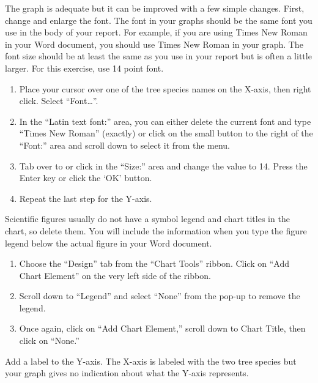 \documentclass[12pt, hidelinks]{exam}
\begin{document}
The graph is adequate but it can be improved with a few simple changes. First, change and enlarge the font. The font in your graphs should be the same font you use in the body of your report. For example, if you are using Times New Roman in your Word document, you should use Times New Roman in your graph. The font size should be at least the same as you use in your report but is often a little larger. For this exercise, use 14 point font.

\begin{enumerate}[resume]
	\item Place your cursor over one of the tree species names on the X-axis, then right click. Select “Font\dots”.

	\item In the “Latin text font:” area, you can either delete the current font and type “Times New Roman” (exactly) or click on the small button to the right of the “Font:” area and scroll down to select it from the menu. 

	\item Tab over to or click in the “Size:” area and change the value to 14. Press the Enter key or click the ‘OK’ button.

	\item Repeat the last step for the Y-axis.
\end{enumerate}

Scientific figures usually do not have a symbol legend and chart titles in the chart, so delete them.  You will include the information when you type the figure legend below the actual figure in your Word document. 

\begin{enumerate}[resume]
	\item Choose the “Design” tab from the “Chart Tools” ribbon. Click on “Add Chart Element” on the very left side of the ribbon.  
	
	\item Scroll down to “Legend” and select “None” from the pop-up to remove the legend.
	
	\item Once again, click on “Add Chart Element,” scroll down to Chart Title, then click on “None.”

\end{enumerate}

Add a label to the Y-axis. The X-axis is labeled with the two tree species but your graph gives no indication about what the Y-axis represents.
\end{document}
